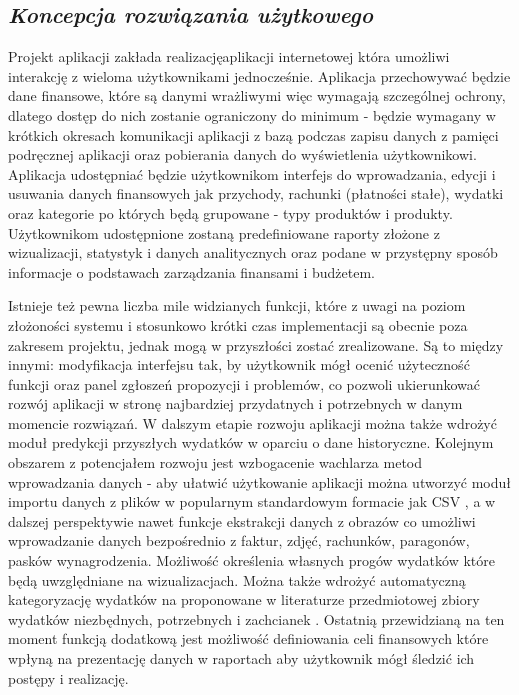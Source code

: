 \documentclass[a4paper,10pt, twoside]{report}
\newcommand{\customstylesection}[1]{\textbf{\textit{#1}}}
\begin{document}
\begin{large}
\section{\customstylesection{Koncepcja rozwiązania użytkowego}}
{Projekt aplikacji zakłada realizacjęaplikacji internetowej która umożliwi 
interakcję z wieloma użytkownikami jednocześnie. Aplikacja przechowywać będzie 
dane finansowe, które są danymi wrażliwymi więc wymagają szczególnej ochrony, 
dlatego dostęp do nich zostanie ograniczony do minimum - będzie wymagany w 
krótkich okresach komunikacji aplikacji z bazą podczas zapisu danych z pamięci 
podręcznej aplikacji oraz pobierania danych do wyświetlenia użytkownikowi. 
Aplikacja udostępniać będzie użytkownikom interfejs do wprowadzania, edycji i 
usuwania danych finansowych jak przychody, rachunki (płatności stałe), wydatki 
oraz kategorie po których będą grupowane - typy produktów i produkty. 
Użytkownikom udostępnione zostaną predefiniowane raporty złożone z wizualizacji,
 statystyk i danych analitycznych oraz podane w przystępny sposób informacje o 
podstawach zarządzania finansami i budżetem.}

\medskip
{Istnieje też pewna liczba mile widzianych funkcji, które z uwagi na poziom 
złożoności systemu i stosunkowo krótki czas implementacji są obecnie poza 
zakresem projektu, jednak mogą w przyszłości zostać zrealizowane. Są to między 
innymi: modyfikacja interfejsu tak, by użytkownik mógł ocenić użyteczność 
funkcji oraz panel zgłoszeń propozycji i problemów, co pozwoli ukierunkować 
rozwój aplikacji w stronę najbardziej przydatnych i potrzebnych w danym momencie
 rozwiązań. W dalszym etapie rozwoju aplikacji można także wdrożyć moduł 
predykcji przyszłych wydatków w oparciu o dane historyczne. Kolejnym obszarem z 
potencjałem rozwoju jest wzbogacenie wachlarza metod wprowadzania danych - aby 
ułatwić użytkowanie aplikacji można utworzyć moduł importu danych z plików w 
popularnym standardowym formacie jak CSV \cite{CSV}, a w dalszej perspektywie 
nawet funkcje ekstrakcji danych z obrazów co umożliwi wprowadzanie danych 
bezpośrednio z faktur, zdjęć, rachunków, paragonów, pasków wynagrodzenia. 
Możliwość określenia własnych progów wydatków które będą uwzględniane na 
wizualizacjach. Można także wdrożyć automatyczną kategoryzację wydatków na 
proponowane w literaturze przedmiotowej zbiory wydatków niezbędnych, potrzebnych
 i zachcianek \cite{budzetdomowypodkontrola}. Ostatnią przewidzianą na ten 
moment funkcją dodatkową jest możliwość definiowania celi finansowych które 
wpłyną na prezentację danych w raportach aby użytkownik mógł śledzić ich postępy
 i realizację.}


\end{large}
\end{document}
